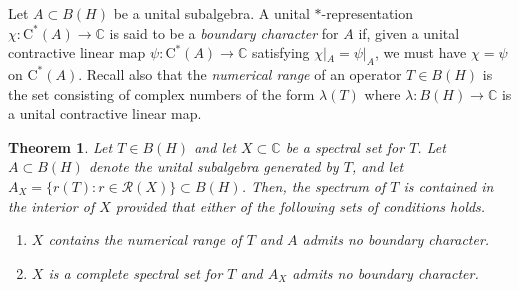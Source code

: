 \documentclass[10pt]{amsart}
\newcommand{\bC}{{\mathbb{C}}}
\newcommand{\R}{{\mathcal{R}}}
\newcommand{\rC}{\mathrm{C}}
\newtheorem{theorem}[lemma]{Theorem}
\theoremstyle{definition}
\begin{document}
Let $A\subset B(H)$ be a unital subalgebra. A unital $*$-representation $\chi:\rC^*(A)\to \bC$ is said to be a \emph{boundary character} for $A$ if, given a unital contractive linear map $\psi:\rC^*(A)\to \bC$ satisfying $\chi|_A=\psi|_A$, we must have $\chi=\psi$ on $\rC^*(A)$. Recall also that the \emph{numerical range} of an operator $T\in B(H)$ is the set consisting of complex numbers of the form $\lambda(T)$ where $\lambda:B(H)\to \bC$ is a unital contractive linear map. 


\begin{theorem}\label{T:ratShilov}
Let $T\in B(H)$ and let $X\subset \bC$ be a spectral set for $T$. Let $A\subset B(H)$ denote the unital subalgebra generated by $T$, and let $A_X=\{r(T):r\in \R(X)\}\subset B(H)$.
Then, the spectrum of $T$ is contained in the interior of $X$ provided that either of the following sets of conditions holds.
\begin{enumerate}[{\rm (a)}]
\item $X$ contains the numerical range of $T$ and $A$ admits no boundary character.
\item  $X$ is a complete spectral set for $T$ and $A_X$ admits no boundary character.
\end{enumerate}
\end{theorem}
\end{document}
